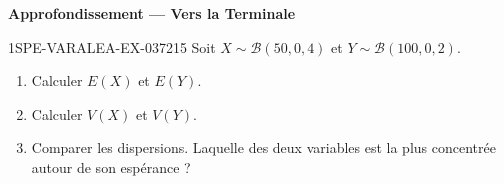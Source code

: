 \begin{center}\textbf{Approfondissement — Vers la Terminale}\end{center}
\begin{exercice}{1SPE-VARALEA-EX-037}{2}{15}
Soit $X \sim \mathcal{B}(50, 0{,}4)$ et $Y \sim \mathcal{B}(100, 0{,}2)$.

\begin{enumerate}
  \item Calculer $E(X)$ et $E(Y)$.
  \item Calculer $V(X)$ et $V(Y)$.
  \item Comparer les dispersions. Laquelle des deux variables est la plus concentrée autour de son espérance ?
\end{enumerate}
\end{exercice}
